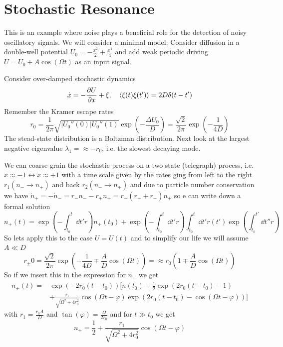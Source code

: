 \documentclass{notebook}
\begin{document}
\chapter{Stochastic Resonance}

This is an example where noise plays a beneficial role for the detection of noisy oscillatory signals. We will consider a minimal model: Consider diffusion in a double-well potential $U_0 = - \frac{x^2}{2} + \frac{x^4}{4}$ and add weak periodic driving $U = U_0 + A \cos(\Omega t)$ as an input signal. 

Consider over-damped stochastic dynamics
%
\begin{equation}
	\dot{x} = -\pdv{U}{x} + \xi, \quad \expval{\xi(t) \xi(t')} = 2 D \delta(t-t')
\end{equation}
%
Remember the Kramer escape rates
%
\begin{equation}
	r_0 = \frac{1}{2 \pi} \sqrt{|U_0''(0)| U_0''(1)} \exp(-\frac{\Delta U_0}{D}) = \frac{\sqrt{2}}{2 \pi} \exp(-\frac{1}{4D})
\end{equation}
%
The stead-state distribution is a Boltzman distribution. Next look at the largest negative eigenvalue $\lambda_1 = \approx -r_0$, i.e. the slowest decaying mode. 

We can coarse-grain the stochastic process on a two state (telegraph) process, i.e. $x \approx -1 \leftrightarrow x \approx +1$ with a time scale given by the rates ging from left to the right $r_1(n_- \to n_+)$ and back $r_2(n_- \to n_+)$
and due to particle number conservation we have $\dot{n}_+ = -\dot{n}_- = r_- n_- - r_+ n_+ = r_-(r_+ + r_-) n_+$ so e can write down a formal solution
%
\begin{equation}
	n_+(t) = \exp(-\int_{t_0}^t \dd{t'} r) n_+(t_0) + \exp(-\int_{t_0}^t \dd{t'} r) \int_{t_0}^t \dd{t'} r(t') \exp(\int_{t_0}^{t'} \dd{t''} r)
\end{equation}
%
So lets apply this to the case $U = U(t)$ and to simplify our life we will assume $A \ll D$
%
\begin{equation}
	r_{\pm}0 = \frac{\sqrt{2}}{2 \pi} \exp(-\frac{1}{4D} \mp \frac{A}{D} \cos(\Omega t))= \approx r_0 \left(1 \mp \frac{A}{D} \cos(\Omega t) \right)
\end{equation}
%
So if we insert this in the expression for $n_+$ we get
%
\begin{align*}
	n_+(t) =& \exp(-2r_0 (t-t_0)) [n(t_0) + \frac{1}{2} \exp(2 r_0 (t-t_0) - 1) \\
	&+ \frac{r_1}{\sqrt{\Omega^2 + 4r_0^2}} \cos(\Omega t - \varphi) \exp(2r_0(t-t_0) - \cos(\Omega t-\varphi))]
\end{align*}
%
with $r_1 = \frac{r_0 A}{D}$ and $\tan(\varphi) = \frac{\Omega}{2 r_0}$ and for $t \gg t_0$ we get
%
\begin{equation}
	n_+ = \frac{1}{2} + \frac{r_1}{\sqrt{\Omega^2 + 4r_0^2}} \cos(\Omega t - \varphi)
\end{equation}
%
\end{document}
